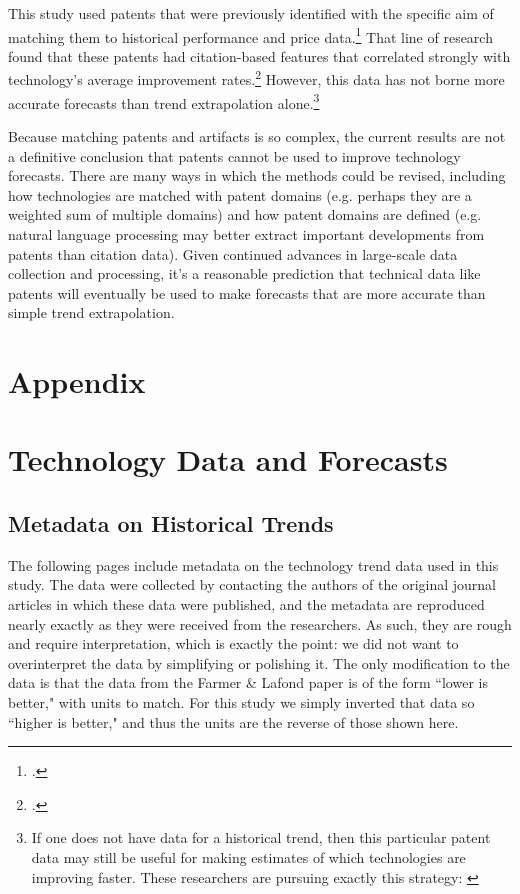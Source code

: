 \documentclass{article}
\newcommand{\beginsupplement}{%
\setcounter{section}{0} \renewcommand{\thesection}{A\arabic{section}}
}
\begin{document}
This study used patents that were previously identified with the specific aim of matching them to historical performance and price data.\footcite{Benson2012,Benson2014} That line of research found that these patents had citation-based features that correlated strongly with technology's average improvement rates.\footcite{Benson2015,Triulzi2017} However, this data has not borne more accurate forecasts than trend extrapolation alone.\footnote{If one does not have data for a historical trend, then this particular patent data may still be useful for making estimates of which technologies are improving faster. These researchers are pursuing exactly this strategy: \cite{Benson2016}}

Because matching patents and artifacts is so complex, the current results are not a definitive conclusion that patents cannot be used to improve technology forecasts. There are many ways in which the methods could be revised, including how technologies are matched with patent domains (e.g. perhaps they are a weighted sum of multiple domains) and how patent domains are defined (e.g. natural language processing may better extract important developments from patents than citation data). Given continued advances in large-scale data collection and processing, it's a reasonable prediction that technical data like patents will eventually be used to make forecasts that are more accurate than simple trend extrapolation.

\newpage

\beginsupplement

\section*{Appendix}



\section{Technology Data and Forecasts}
\subsection{Metadata on Historical Trends}\label{time_series_metadata}
The following pages include metadata on the technology trend data used in this study. The data were collected by contacting the authors of the original journal articles in which these data were published, and the metadata are reproduced nearly exactly as they were received from the researchers. As such, they are rough and require interpretation, which is exactly the point: we did not want to overinterpret the data by simplifying or polishing it. The only modification to the data is that the data from the Farmer \& Lafond paper is of the form ``lower is better," with units to match. For this study we simply inverted that data so ``higher is better," and thus the units are the reverse of those shown here. 
\end{document}
